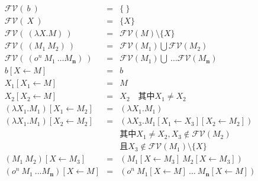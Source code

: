 \documentclass{book}
\begin{document}
\begin{framed}
$$
\begin{array}{lcl}
 \mathcal{FV}(\ b\ ) & = & \{\ \} \\
 \mathcal{FV}(\ X\ ) & = & \{X\} \\
 \mathcal{FV}(\ (\lambda X.M)\ ) & = &  \mathcal{FV}(M)\setminus\{X\} \\
 \mathcal{FV}(\ (M_1\ M_2)\ ) & = &  \mathcal{FV}(M_1) \bigcup \mathcal{FV}(M_2) \\
 \mathcal{FV}(\ (o^n\ M_1\ \ldots M_\textbf{n})\ ) & = &  \mathcal{FV}(M_1) \bigcup \ \ldots\mathcal{FV}(M_\textbf{n}) \\
 b[X\leftarrow M] & = & b\\
 X_1[X_1\leftarrow M] & = & M \\
 X_2[X_2\leftarrow M] & = & X_2 \quad \text{其中}X_1\neq X_2 \\
 (\lambda X_1.M_1)[X_1\leftarrow M_2] & = & (\lambda X_1.M_1) \\
 (\lambda X_1.M_1)[X_2\leftarrow M_2] & = & (\lambda X_3.M_1[X_1\leftarrow X_3][X_2\leftarrow M_2]) \\
 & & \text{其中} X_1\neq X_2, X_3\not\in \mathcal{FV}(M_2)\\
 & & \text{且}X_3\not\in\mathcal{FV}(M_1)\setminus\{X\}\\
 (M_1\ M_2)[X\leftarrow M_3] & = & (M_1[X\leftarrow M_3]\ M_2[X\leftarrow M_3]) \\
 (o^n\ M_1\ \ldots M_\textbf{n})[X\leftarrow M] & = & (o^n\ M_1[X\leftarrow M]\ \ldots\ M_\textbf{n}[X\leftarrow M]) 
\end{array}
$$
\end{framed}
\end{document}
